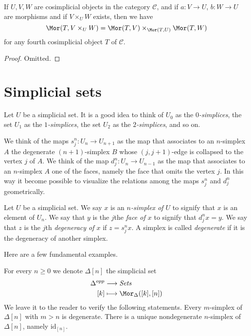 \begin{lemma}
\label{lemma-fibre-product-cosimplicial-objects}
If $U, V, W$ are cosimplicial objects in the category $\mathcal{C}$,
and if $a : V \to U$, $b : W \to U$ are morphisms
and if $V \times_U W$ exists, then we have
$$
\Mor(T, V \times_U W) =
\Mor(T, V) \times_{\Mor(T, U)}
\Mor(T, W)
$$
for any fourth cosimplicial object $T$ of $\mathcal{C}$.
\end{lemma}

\begin{proof}
Omitted.
\end{proof}














\section{Simplicial sets}
\label{section-simplicial-set}

\noindent
Let $U$ be a simplicial set. It is a good idea to think of
$U_0$ as the {\it $0$-simplices}, the set $U_1$ as the
{\it $1$-simplices},
the set $U_2$ as the {\it $2$-simplices}, and so on.

\medskip\noindent
We think of the maps $s^n_j : U_n \to U_{n + 1}$ as
the map that associates to an $n$-simplex $A$ the degenerate
$(n + 1)$-simplex $B$ whose $(j, j + 1)$-edge is collapsed
to the vertex $j$ of $A$. We think of the map $d^n_j : U_n \to U_{n - 1}$
as the map that associates to an $n$-simplex $A$ one of the
faces, namely the face that omits the vertex $j$.
In this way it become possible to visualize the relations
among the maps $s^n_j$ and $d^n_j$ geometrically.

\begin{definition}
\label{definition-terminology-simplicial-sets}
Let $U$ be a simplicial set.
We say $x$ is an {\it $n$-simplex of $U$} to signify that
$x$ is an element of $U_n$. We say that $y$ is the $j$the
{\it face of $x$} to signify that $d^n_jx = y$. We say that
$z$ is the $j$th {\it degeneracy of $x$} if $z = s^n_jx$.
A simplex is called {\it degenerate} if it is the degeneracy
of another simplex.
\end{definition}

\noindent
Here are a few fundamental examples.

\begin{example}
\label{example-simplex-simplicial-set}
For every $n \geq 0$ we denote $\Delta[n]$ the simplicial set
\begin{align*}
\Delta^{opp} & \longrightarrow \textit{Sets} \\
[k] & \longmapsto \Mor_{\Delta}([k], [n])
\end{align*}
We leave it to the reader to verify the following statements.
Every $m$-simplex of $\Delta[n]$ with $m > n$ is degenerate.
There is a unique nondegenerate $n$-simplex of $\Delta[n]$,
namely $\text{id}_{[n]}$.
\end{example}

